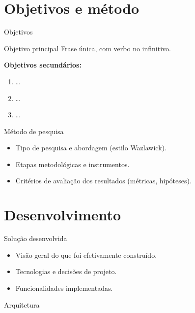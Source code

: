 \documentclass[
    aspectratio=169,
    12pt,
    brazil
]{beamer}
\begin{document}
\section{Objetivos e método}
\begin{frame}{Objetivos}
  \begin{block}{Objetivo principal}
    Frase única, com verbo no infinitivo.
  \end{block}
  \textbf{Objetivos secundários:}
  \begin{enumerate}
    \item \ldots
    \item \ldots
    \item \ldots
  \end{enumerate}
\end{frame}

\begin{frame}{Método de pesquisa}
  \begin{itemize}
    \item Tipo de pesquisa e abordagem (estilo Wazlawick).
    \item Etapas metodológicas e instrumentos.
    \item Critérios de avaliação dos resultados (métricas, hipóteses).
  \end{itemize}
\end{frame}

\section{Desenvolvimento}
\begin{frame}{Solução desenvolvida}
  \begin{itemize}
    \item Visão geral do que foi efetivamente construído.
    \item Tecnologias e decisões de projeto.
    \item Funcionalidades implementadas.
  \end{itemize}
\end{frame}

\begin{frame}{Arquitetura}
  \centering
\end{frame}
\end{document}
